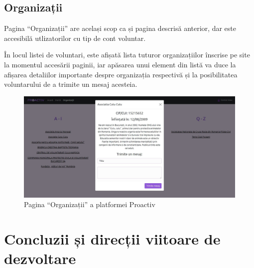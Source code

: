 \documentclass[12pt,a4paper]{report}
\begin{document}
\newpage
\section{Organizații}
\par
Pagina “Organizații” are același scop ca și pagina descrisă anterior, dar este accesibilă utlizatorilor cu tip de cont voluntar.
\\\par
În locul listei de voluntari, este afișată lista tuturor organizațiilor înscrise pe site la momentul accesării paginii, iar apăsarea unui element din listă va duce la afișarea detaliilor importante despre organizația respectivă și la posibilitatea voluntarului de a trimite un mesaj acesteia.
\\
\begin{figure}[H]
\centering
  \includegraphics[width=1\linewidth]{./imagini/org.jpg}
  \caption{Pagina “Organizații” a platformei Proactiv}
\end{figure}

\chapter{Concluzii și direcții viitoare de dezvoltare}
\end{document}
